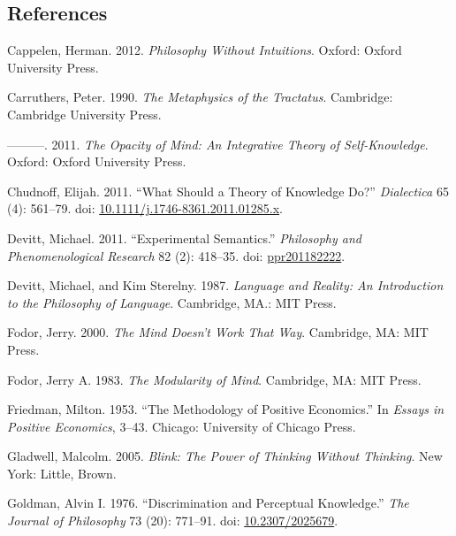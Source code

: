 \documentclass[
  10pt,
  letterpaper,
  DIV=11,
  numbers=noendperiod,
  twoside]{scrartcl}
\newlength{\cslhangindent}
\newenvironment{CSLReferences}[2] %
 {\begin{list}{}{%
  \setlength{\itemindent}{0pt}
  \setlength{\leftmargin}{0pt}
  \setlength{\parsep}{0pt}
  \ifodd #1
   \setlength{\leftmargin}{\cslhangindent}
   \setlength{\itemindent}{-1\cslhangindent}
  \fi
  \setlength{\itemsep}{#2\baselineskip}}}
 {\end{list}}
\begin{document}
\subsection*{References}\label{references}

\label{refs}
\begin{CSLReferences}{1}{0}
Cappelen, Herman. 2012. \emph{Philosophy Without Intuitions}. Oxford:
Oxford University Press.

Carruthers, Peter. 1990. \emph{The Metaphysics of the Tractatus}.
Cambridge: Cambridge University Press.

---------. 2011. \emph{The Opacity of Mind: An Integrative Theory of
Self-Knowledge}. Oxford: Oxford University Press.

Chudnoff, Elijah. 2011. {``What Should a Theory of Knowledge Do?''}
\emph{Dialectica} 65 (4): 561--79. doi:
\href{https://doi.org/10.1111/j.1746-8361.2011.01285.x}{10.1111/j.1746-8361.2011.01285.x}.

Devitt, Michael. 2011. {``Experimental Semantics.''} \emph{Philosophy
and Phenomenological Research} 82 (2): 418--35. doi:
\href{https://doi.org/ppr201182222}{ppr201182222}.

Devitt, Michael, and Kim Sterelny. 1987. \emph{Language and Reality: An
Introduction to the Philosophy of Language}. Cambridge, MA.: {MIT}
Press.

Fodor, Jerry. 2000. \emph{The Mind Doesn't Work That Way}. Cambridge,
MA: {MIT} Press.

Fodor, Jerry A. 1983. \emph{The Modularity of Mind}. Cambridge, MA: MIT
Press.

Friedman, Milton. 1953. {``The Methodology of Positive Economics.''} In
\emph{Essays in Positive Economics}, 3--43. Chicago: University of
Chicago Press.

Gladwell, Malcolm. 2005. \emph{Blink: The Power of Thinking Without
Thinking}. New York: Little, Brown.

Goldman, Alvin I. 1976. {``Discrimination and Perceptual Knowledge.''}
\emph{The Journal of Philosophy} 73 (20): 771--91. doi:
\href{https://doi.org/10.2307/2025679}{10.2307/2025679}.


\end{CSLReferences}
\end{document}
